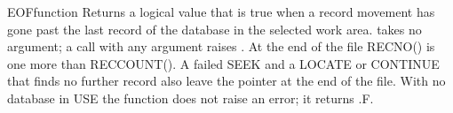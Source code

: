 \begin{XbaseEntry}{EOF}{function}
Returns a logical value that is true when a record movement has gone past the last record of the database in the selected work area.
\Syntax
{}
\Usage
{} takes no argument; a call with any argument raises . At the end of the file RECNO() is one more than RECCOUNT(). A failed SEEK and a LOCATE or CONTINUE that finds no further record also leave the pointer at the end of the file. With no database in USE the function does not raise an error; it returns .F.
\Examples
{}
\end{XbaseEntry}

